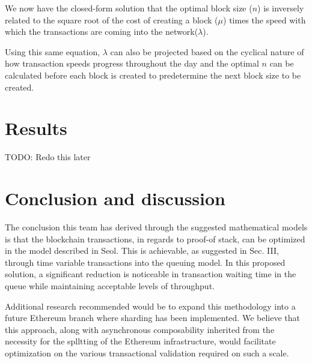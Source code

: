 \documentclass[conference]{IEEEtran}
\begin{document}
We now have the closed-form solution that the optimal block size ($n$) is inversely related to
the square root of the cost of creating a block ($\mu$) times the speed with which the transactions 
are coming into the network($\lambda$). 

Using this same equation, $\lambda$ can also be projected based on the cyclical nature of how transaction
speeds progress throughout the day and the optimal $n$ can be calculated before each block is created to 
predetermine the next block size to be created. 
\fi

\section{Results}

TODO: Redo this later

\section{Conclusion and discussion}

The conclusion this team has derived through the suggested mathematical models is that the blockchain transactions,
in regards to proof-of stack, can be optimized in the model described in Seol\cite{2020_ACM_Seol}. This is achievable, 
as suggested in Sec. III, through time variable transactions into the queuing model. In this proposed solution, a
significant reduction is noticeable in transaction waiting time in the queue while maintaining acceptable levels of
throughput.

Additional research recommended would be to expand this methodology into a future Ethereum branch where sharding
has been implemented. We believe that this approach, along with asynchronous composability inherited from the necessity
for the splltting of the Ethereum infrastructure, would facilitate optimization on the various transactional validation 
required on such a scale.



\end{document}
